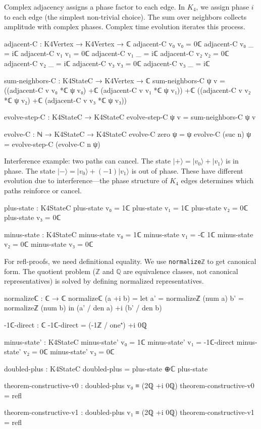 \documentclass[11pt,a4paper]{book}
\begin{document}
Complex adjacency assigns a phase factor to each edge. In $K_4$, we assign phase $i$ to each edge (the simplest non-trivial choice). The sum over neighbors collects amplitude with complex phases. Complex time evolution iterates this process.

\begin{code}
adjacent-C : K4Vertex → K4Vertex → ℂ
adjacent-C v₀ v₀ = 0ℂ
adjacent-C v₀ _  = iℂ
adjacent-C v₁ v₁ = 0ℂ
adjacent-C v₁ _  = iℂ
adjacent-C v₂ v₂ = 0ℂ
adjacent-C v₂ _  = iℂ
adjacent-C v₃ v₃ = 0ℂ
adjacent-C v₃ _  = iℂ

sum-neighbors-C : K4StateC → K4Vertex → ℂ
sum-neighbors-C ψ v = ((adjacent-C v v₀ *ℂ ψ v₀) +ℂ (adjacent-C v v₁ *ℂ ψ v₁))
                   +ℂ ((adjacent-C v v₂ *ℂ ψ v₂) +ℂ (adjacent-C v v₃ *ℂ ψ v₃))

evolve-step-C : K4StateC → K4StateC
evolve-step-C ψ v = sum-neighbors-C ψ v

evolve-C : ℕ → K4StateC → K4StateC
evolve-C zero ψ = ψ
evolve-C (suc n) ψ = evolve-step-C (evolve-C n ψ)
\end{code}

Interference example: two paths can cancel. The state $|+\rangle = |v_0\rangle + |v_1\rangle$ is in phase. The state $|-\rangle = |v_0\rangle + (-1)|v_1\rangle$ is out of phase. These have different evolution due to interference---the phase structure of $K_4$ edges determines which paths reinforce or cancel.

\begin{code}
plus-state : K4StateC
plus-state v₀ = 1ℂ
plus-state v₁ = 1ℂ
plus-state v₂ = 0ℂ
plus-state v₃ = 0ℂ

minus-state : K4StateC
minus-state v₀ = 1ℂ
minus-state v₁ = -ℂ 1ℂ
minus-state v₂ = 0ℂ
minus-state v₃ = 0ℂ
\end{code}

For refl-proofs, we need definitional equality. We use \texttt{normalizeℤ} to get canonical form. The quotient problem ($\mathbb{Z}$ and $\mathbb{Q}$ are equivalence classes, not canonical representatives) is solved by defining normalized representatives.

\begin{code}
normalizeℂ : ℂ → ℂ
normalizeℂ (a +i b) = 
  let a' = normalizeℤ (num a)
      b' = normalizeℤ (num b)
  in (a' / den a) +i (b' / den b)

-1ℂ-direct : ℂ
-1ℂ-direct = (-1ℤ / one⁺) +i 0ℚ

minus-state' : K4StateC
minus-state' v₀ = 1ℂ
minus-state' v₁ = -1ℂ-direct
minus-state' v₂ = 0ℂ
minus-state' v₃ = 0ℂ

doubled-plus : K4StateC
doubled-plus = plus-state ⊕ℂ plus-state

theorem-constructive-v0 : doubled-plus v₀ ≡ (2ℚ +i 0ℚ)
theorem-constructive-v0 = refl

theorem-constructive-v1 : doubled-plus v₁ ≡ (2ℚ +i 0ℚ)
theorem-constructive-v1 = refl
\end{code}
\end{document}
